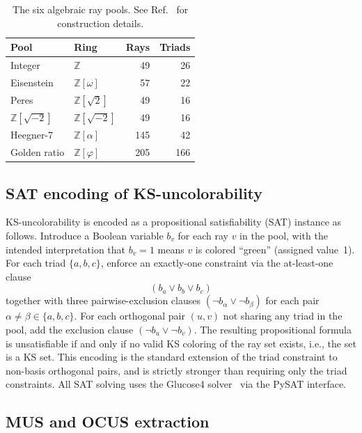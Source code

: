\documentclass[twocolumn,pra,superscriptaddress,nofootinbib]{revtex4-2}
\newcommand{\Z}{\mathbb{Z}}
\begin{document}
\begin{table}[t]
\caption{The six algebraic ray pools. See Ref.~\cite{Kernaghan2026algebraic} for
construction details.}
\label{tab:pools}
\begin{tabular}{llrr}
\toprule
Pool & Ring & Rays & Triads \\
\midrule
Integer      & $\Z$              &  49 &  26 \\
Eisenstein   & $\Z[\omega]$      &  57 &  22 \\
Peres        & $\Z[\sqrt{2}]$    &  49 &  16 \\
$\Z[\sqrt{-2}]$ & $\Z[\sqrt{-2}]$ & 49 &  16 \\
Heegner-7    & $\Z[\alpha]$      & 145 &  42 \\
Golden ratio & $\Z[\varphi]$     & 205 & 166 \\
\bottomrule
\end{tabular}
\end{table}

\subsection{SAT encoding of KS-uncolorability}

KS-uncolorability is encoded as a propositional satisfiability (SAT) instance as
follows. Introduce a Boolean variable $b_v$ for each ray $v$ in the pool, with the
intended interpretation that $b_v = 1$ means $v$ is colored ``green'' (assigned
value~1). For each triad $\{a, b, c\}$, enforce an exactly-one constraint via the
at-least-one clause
\begin{equation}
  (b_a \vee b_b \vee b_c)
\end{equation}
together with three pairwise-exclusion clauses $(\neg b_\alpha \vee \neg b_\beta)$
for each pair $\alpha \neq \beta \in \{a,b,c\}$. For each orthogonal pair $(u,v)$
not sharing any triad in the pool, add the exclusion clause $(\neg b_u \vee \neg b_v)$.
The resulting propositional formula is unsatisfiable if and only if no valid KS
coloring of the ray set exists, i.e., the set is a KS set. This encoding is the
standard extension of the triad constraint to non-basis orthogonal pairs, and is
strictly stronger than requiring only the triad constraints. All SAT solving uses the
Glucose4 solver~\cite{AudemardSimon2018} via the PySAT interface.

\subsection{MUS and OCUS extraction}
\end{document}
